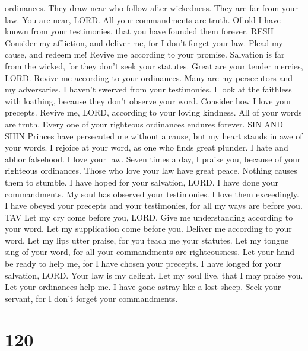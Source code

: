 ordinances.  They draw near who follow after wickedness.
They are far from your law.  You are near, LORD. All your
commandments are truth.  Of old I have known from your
testimonies, that you have founded them forever. RESH 
Consider my affliction, and deliver me, for I don't forget your law.
 Plead my cause, and redeem me! Revive me according to
your promise.  Salvation is far from the wicked, for they
don't seek your statutes.  Great are your tender mercies,
LORD. Revive me according to your ordinances.  Many are my
persecutors and my adversaries. I haven't swerved from your testimonies.
 I look at the faithless with loathing, because they don't
observe your word.  Consider how I love your precepts.
Revive me, LORD, according to your loving kindness.  All
of your words are truth. Every one of your righteous ordinances endures
forever. SIN AND SHIN  Princes have persecuted me without
a cause, but my heart stands in awe of your words.  I
rejoice at your word, as one who finds great plunder.  I
hate and abhor falsehood. I love your law.  Seven times a
day, I praise you, because of your righteous ordinances. 
Those who love your law have great peace. Nothing causes them to
stumble.  I have hoped for your salvation, LORD. I have
done your commandments.  My soul has observed your
testimonies. I love them exceedingly.  I have obeyed your
precepts and your testimonies, for all my ways are before you. TAV
 Let my cry come before you, LORD. Give me understanding
according to your word.  Let my supplication come before
you. Deliver me according to your word.  Let my lips utter
praise, for you teach me your statutes.  Let my tongue
sing of your word, for all your commandments are righteousness.
 Let your hand be ready to help me, for I have chosen your
precepts.  I have longed for your salvation, LORD. Your
law is my delight.  Let my soul live, that I may praise
you. Let your ordinances help me.  I have gone astray like
a lost sheep. Seek your servant, for I don't forget your commandments.

\hypertarget{section-112}{%
\section{120}\label{section-112}}

